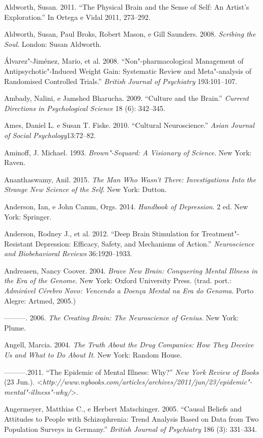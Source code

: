 Aldworth, Susan. 2011. ``The Physical Brain and the Sense of Self: An
Artist's Exploration.'' In Ortega e Vidal 2011, 273--292.

Aldworth, Susan, Paul Broks, Robert Mason, e Gill Saunders. 2008.
\emph{Scribing the Soul}. London: Susan Aldworth.

Álvarez"-Jiménez, Mario, et al. 2008. ``Non"-pharmacological Management of
Antipsychotic"-Induced Weight Gain: Systematic Review and Meta"-analysis
of Randomised Controlled Trials.'' \emph{British Journal of Psychiatry}
193:101--107.

Ambady, Nalini, e Jamshed Bharucha. 2009. ``Culture and the Brain.''
\emph{Current Directions in Psychological Science} 18 (6): 342--345.

Ames, Daniel L. e Susan T. Fiske. 2010. ``Cultural Neuroscience.''
\emph{Asian Journal of Social Psychology}13:72--82.

Aminoff, J. Michael. 1993. \emph{Brown"-Sequard: A Visionary of Science}.
New York: Raven.

Ananthaswamy, Anil. 2015. \emph{The Man Who Wasn't There: Investigations
Into the Strange New Science of the Self}. New York: Dutton.

Anderson, Ian, e John Camm, Orgs. 2014. \emph{Handbook of Depression}. 2
ed. New York: Springer.

Anderson, Rodney J., et al. 2012. ``Deep Brain Stimulation for
Treatment"-Resistant Depression: Efficacy, Safety, and Mechanisms of
Action.'' \emph{Neuroscience and Biobehavioral Reviews} 36:1920--1933.

Andreasen, Nancy Coover. 2004. \emph{Brave New Brain: Conquering Mental
Illness in the Era of the Genome}. New York: Oxford University Press.
(trad. port.: \emph{Admirável Cérebro Novo: Vencendo a Doença Mental na
Era do Genoma}. Porto Alegre: Artmed, 2005.)

---------. 2006. \emph{The Creating Brain: The Neuroscience of Genius}.
New York: Plume.

Angell, Marcia. 2004. \emph{The Truth About the Drug Companies: How They
Deceive Us and What to Do About It}. New York: Random House.

---------.2011. ``The Epidemic of Mental Illness: Why?'' \emph{New York
Review of Books} (23 Jun.).
\textless{}\emph{http://www.nybooks.com/articles/archives/2011/jun/23/epidemic"-mental"-illness"-why/}\textgreater{}.

Angermeyer, Matthias C., e Herbert Matschinger. 2005. ``Causal Beliefs
and Attitudes to People with Schizophrenia: Trend Analysis Based on Data
from Two Population Surveys in Germany.'' \emph{British Journal of
Psychiatry} 186 (3): 331--334.


